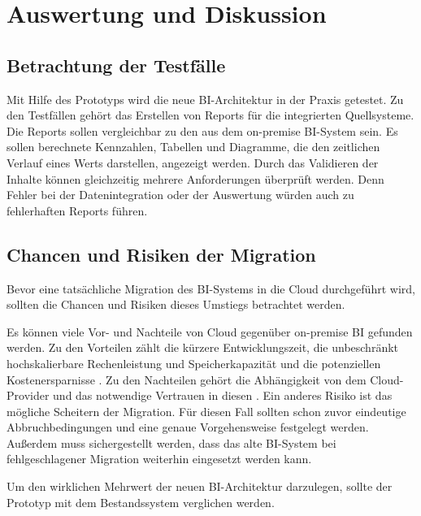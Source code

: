\section{Auswertung und Diskussion} \label{sec:umsetzung:auswertung}

\subsection{Betrachtung der Testfälle} \label{subsec:umsetzung:auswertung:testen}
Mit Hilfe des Prototyps wird die neue BI-Architektur in der Praxis getestet. Zu den Testfällen gehört das Erstellen von Reports für die integrierten Quellsysteme. Die Reports sollen vergleichbar zu den aus dem on-premise BI-System sein. Es sollen berechnete Kennzahlen, Tabellen und Diagramme, die den zeitlichen Verlauf eines Werts darstellen, angezeigt werden. Durch das Validieren der Inhalte können gleichzeitig mehrere Anforderungen überprüft werden. Denn Fehler bei der Datenintegration oder der Auswertung würden auch zu fehlerhaften Reports führen.

\subsection{Chancen und Risiken der Migration} \label{subsec:umsetzung:auswertung:diskussion}
Bevor eine tatsächliche Migration des BI-Systems in die Cloud durchgeführt wird, sollten die Chancen und Risiken dieses Umstiegs betrachtet werden.

Es können viele Vor- und Nachteile von Cloud gegenüber on-premise BI gefunden werden. Zu den Vorteilen zählt die kürzere Entwicklungszeit, die unbeschränkt hochskalierbare Rechenleistung und Speicherkapazität und die potenziellen Kostenersparnisse \cite{ouf_cloud_2011}. Zu den Nachteilen gehört die Abhängigkeit von dem Cloud-Provider und das notwendige Vertrauen in diesen \cite{menon_business_2012}. Ein anderes Risiko ist das mögliche Scheitern der Migration. Für diesen Fall sollten schon zuvor eindeutige Abbruchbedingungen und eine genaue Vorgehensweise festgelegt werden. Außerdem muss sichergestellt werden, dass das alte BI-System bei fehlgeschlagener Migration weiterhin eingesetzt werden kann.

Um den wirklichen Mehrwert der neuen BI-Architektur darzulegen, sollte der Prototyp mit dem Bestandssystem verglichen werden.